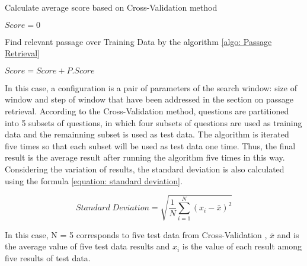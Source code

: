  \begin{algorithm}
\caption{Calculate average score based on Cross-Validation method}
\label{alg: Cross-Validation}
\begin{algorithmic}
\STATE $Score = 0$

\STATE Find relevant passage over Training Data by the algorithm \ref{algo: Passage Retrieval}
			
			
\ENDFOR
\ENDFOR

\STATE $Score = Score + P.Score$
		
\ENDFOR
	

\end{algorithmic}
\end{algorithm}

In this case, a configuration is a pair of parameters of the search window: size of window and step of window that have been addressed in the section on passage retrieval. According to the Cross-Validation method, questions are partitioned into 5 subsets of questions, in which four subsets of questions are used as training data and the remainning subset is used as test data. The algorithm is iterated five times so that each subset will be used as test data one time. Thus, the final result is the average result after running the algorithm five times in this way. Considering the variation of results, the standard deviation is also calculated using the formula \ref{equation: standard deviation}. 

\begin{equation}
\label{equation: standard deviation}
	Standard \; Deviation = \sqrt{\dfrac{1}{N} \sum_{i=1}^N (x_i -\bar{x} )^2 }
\end{equation}


In this case, N = 5 corresponds to five test data from Cross-Validation , \ensuremath{\bar{x}} and is the average value of five test data results and \ensuremath{x_i} is the value of each result among five results of test data.

